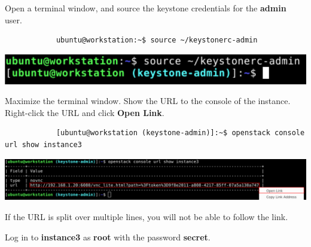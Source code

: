 \documentclass[letterpaper, 12pt]{article}
\begin{document}
\begin{enumerate}
    \begin{labstep}
        Open a terminal window, and source the keystone credentials for the \textbf{admin} user.
        \begin{lstlisting}
            ubuntu@workstation:~$ source ~/keystonerc-admin
        \end{lstlisting}

        \begin{center}
            \includegraphics[width=\linewidth]{images/part4/step1.png}
        \end{center}
    \end{labstep}

    \begin{labstep}
        Maximize the terminal window.
        Show the URL to the console of the instance.
        Right-click the URL and click \textbf{Open Link}.
        \begin{lstlisting}
            [ubuntu@workstation (keystone-admin)]:~$ openstack console url show instance3
        \end{lstlisting}

        \begin{center}
            \includegraphics[width=\linewidth]{images/part4/step2.png}
        \end{center}
    \end{labstep}

    \begin{tipbox}
        If the URL is split over multiple lines, you will not be able to follow the link.
    \end{tipbox}

    \begin{labstep}
        Log in to \textbf{instance3} as \textbf{root} with the password \textbf{secret}.


\end{labstep}
\end{enumerate}
\end{document}
